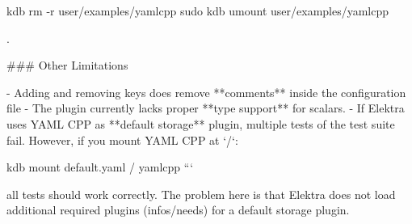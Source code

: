 kdb rm -\/r user/examples/yamlcpp sudo kdb umount user/examples/yamlcpp 
\begin{DoxyCode}
.

### Other Limitations

- Adding and removing keys does remove **comments** inside the configuration file
- The plugin currently lacks proper **type support** for scalars.
- If Elektra uses YAML CPP as **default storage** plugin, multiple tests of the test suite fail. However,
       if you mount YAML CPP at `/`:
\end{DoxyCode}
 kdb mount default.\+yaml / yamlcpp ```

all tests should work correctly. The problem here is that Elektra does not load additional required plugins ({\ttfamily infos/needs}) for a default storage plugin. 